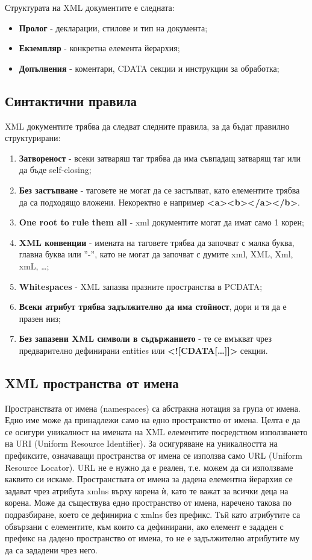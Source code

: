 \documentclass[fleqn,12pt]{article}
\begin{document}
Структурата на XML документите е следната:
\begin{itemize}
    \item \textbf{Пролог} - декларации, стилове и тип на документа;
    \item \textbf{Екземпляр} - конкретна елемента йерархия;
    \item \textbf{Допълнения} - коментари, CDATA секции и инструкции за обработка;
\end{itemize}


\subsection{Синтактични правила}

XML документите трябва да следват следните правила, за да бъдат правилно структурирани:
\begin{enumerate}
    \item \textbf{Затвореност} - всеки затваряш таг трябва да има съвпадащ затварящ таг или да бъде self-closing;
    \item \textbf{Без застъпване} - таговете не могат да се застъпват, като елементите трябва да са подходящо вложени. Некоректно е например \textbf{<a><b></a></b>}.
    \item \textbf{One root to rule them all} - xml документите могат да имат само 1 корен;
    \item \textbf{XML конвенции} - имената на таговете трябва да започват с малка буква, главна буква или ''-'', като не могат да започват с думите xml, XML, Xml, xmL, \dots;
    \item \textbf{Whitespaces} - XML запазва празните пространства в PCDATA;
    \item \textbf{Всеки атрибут трябва задължително да има стойност}, дори и тя да е празен низ;
    \item \textbf{Без запазени XML символи в съдържанието} - те се вмъкват чрез предварително дефинирани entities или \textbf{<![CDATA[\dots]]>} секции.
\end{enumerate}

\subsection{XML пространства от имена}

Пространствата от имена (namespaces) са абстракна нотация за група от имена.
Едно име може да принадлежи само на едно пространство от имена.
Целта е да се осигури уникалност на имената на XML елементите посредством използването на URI (Uniform Resource Identifier).
За осигуряване на уникалността на префиксите, означаващи пространства от имена се използва само URL (Uniform Resource Locator).
URL не е нужно да е реален, т.е. можем да си използваме каквито си искаме.
\bigbreak
Пространствата от имена за дадена елементна йерархия се задават чрез атрибута xmlns върху корена ѝ, като те важат за всички деца на корена.
Може да съществува едно пространство от имена, наречено такова по подразбиране, което се дефинириа с xmlns без префикс.
Тъй като атрибутите са обвързани с елементите, към които са дефинирани, ако елемент е зададен с префикс на дадено пространство от имена, то не е задължително атрибутите му да са зададени чрез него.
\end{document}
